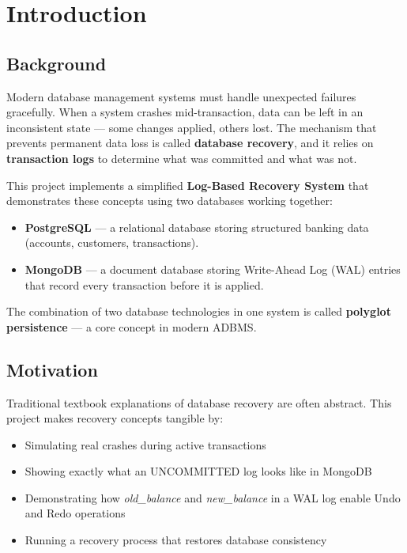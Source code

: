 
\chapter{Introduction}

\section{Background}

Modern database management systems must handle unexpected failures gracefully.
When a system crashes mid-transaction, data can be left in an inconsistent
state --- some changes applied, others lost. The mechanism that prevents
permanent data loss is called \textbf{database recovery}, and it relies on
\textbf{transaction logs} to determine what was committed and what was not.

This project implements a simplified \textbf{Log-Based Recovery System} that
demonstrates these concepts using two databases working together:

\begin{itemize}
  \item \textbf{PostgreSQL} --- a relational database storing structured
        banking data (accounts, customers, transactions).
  \item \textbf{MongoDB} --- a document database storing Write-Ahead Log
        (WAL) entries that record every transaction before it is applied.
\end{itemize}

The combination of two database technologies in one system is called
\textbf{polyglot persistence} --- a core concept in modern ADBMS.

\section{Motivation}

Traditional textbook explanations of database recovery are often abstract.
This project makes recovery concepts tangible by:

\begin{itemize}
  \item Simulating real crashes during active transactions
  \item Showing exactly what an UNCOMMITTED log looks like in MongoDB
  \item Demonstrating how \textit{old\_balance} and \textit{new\_balance}
        in a WAL log enable Undo and Redo operations
  \item Running a recovery process that restores database consistency
\end{itemize}

